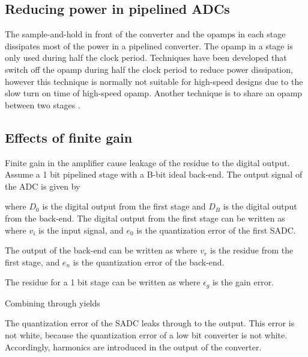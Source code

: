 \subsection{Reducing power in pipelined ADCs}
The sample-and-hold in front of the converter and the opamps in each
stage dissipates most of the power in a pipelined converter. 
The opamp in a stage is only used during half the clock
period. Techniques have been developed that switch off the opamp
during half the clock period to reduce power dissipation, however this
technique is normally not suitable for high-speed designs due to the
slow turn on time of high-speed opamp. Another
technique is to share an opamp between two stages \cite{plassche}.  

\subsection{Effects of finite gain}
Finite gain in the amplifier cause leakage of the residue to the
digital output. Assume a 1 bit pipelined stage with a B-bit ideal
back-end.
The output signal of the ADC is given by

where $D_0$ is the digital output from the first stage and $D_B$ is
the digital output from the back-end. The digital output from the first
stage can be written as
where $v_i$ is the input signal, and $e_0$ is the quantization error
of the first SADC. 

The output of the back-end can be written as
where $v_r$ is the residue from the first stage, and $e_n$ is the
quantization error of the back-end. 

The residue for a 1 bit stage can be written as
where $\epsilon_g$ is the gain error.

Combining  through  yields

The quantization error of the SADC leaks through to the output. This
error is not white, because the quantization error of a low bit
converter is not white. Accordingly, harmonics are introduced in the
output of the converter. 





